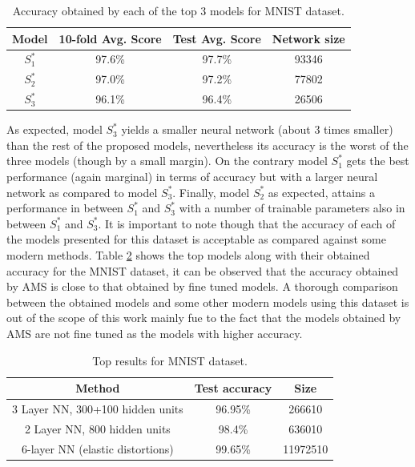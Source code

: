 \documentclass[journal]{IEEEtran}
\begin{document}
\begin{table}[!htb]
\begin{center}
\begin{tabular}{| c | c | c | c |}
\hline
Model & 10-fold Avg. Score & Test Avg. Score & Network size\\
\hline
$S^*_1$ & 97.6\% & 97.7\% & 93346\\
$S^*_2$ & 97.0\% & 97.2\% & 77802\\
$S^*_3$ & 96.1\% & 96.4\% & 26506\\
\hline
\end{tabular}
\end{center}
\caption{Accuracy obtained by each of the top 3 models for MNIST dataset.}
\label{table:avg_accuracies_mnist}
\end{table}

As expected, model $S^*_3$ yields a smaller neural network (about 3 times smaller) than the rest of the proposed models, nevertheless its accuracy is the worst of the three models (though by a small margin). On the contrary model $S^*_1$ gets the best performance (again marginal) in terms of accuracy but with a larger neural network as compared to model $S^*_3$. Finally, model $S^*_2$ as expected, attains a performance in between $S^*_1$ and $S^*_3$ with a number of trainable parameters also in between $S^*_1$ and $S^*_3$. It is important to note though that the accuracy of each of the models presented for this dataset is acceptable as compared against some modern methods. Table \ref{table:MNIST_results_top} shows the top models along with their obtained accuracy for the MNIST dataset, it can be observed that the accuracy obtained by AMS is close to that obtained by fine tuned models. A thorough comparison between the obtained models and some other modern models using this dataset is out of the scope of this work mainly fue to the fact that the models obtained by AMS are not fine tuned as the models with higher accuracy.

\begin{table}[!htb]
\begin{center}
\begin{tabular}{| c | c | c |}
\hline
Method & Test accuracy & Size\\
\hline
3 Layer NN, 300+100 hidden units \cite{lecun-98} &  96.95\% & 266610\\
2 Layer NN, 800 hidden units \cite{Simard2003} & 98.4\% & 636010\\
6-layer NN (elastic distortions) \cite{Ciresan2010}  & 99.65\% & 11972510\\
\hline
\end{tabular}
\end{center}
\caption{Top results for MNIST dataset.}
\label{table:MNIST_results_top}
\end{table}
\end{document}
